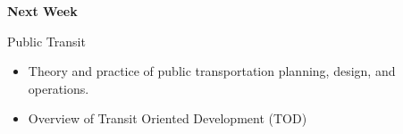 \documentclass[aspectratio=169]{beamer}
\begin{document}
\begin{frame}
	\textbf{Next Week} 
	
	\vspace{4mm}
	
	Public Transit
	
	\begin{itemize}
				
		
		\item Theory and practice of public transportation planning, design, and operations. 
		
		\item Overview of Transit Oriented Development (TOD)
		
	\end{itemize}
	
\end{frame}
\end{document}
